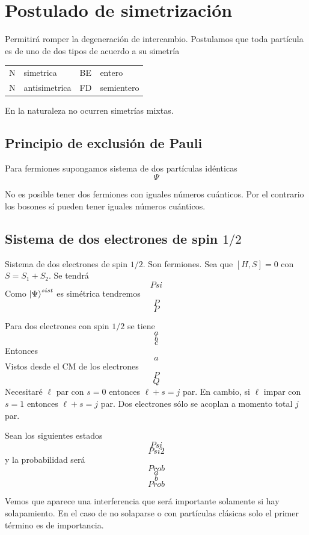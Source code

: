 \documentclass[10pt,oneside]{CBFT_book}
\begin{document}
\section{Postulado de simetrización}

Permitirá romper la degeneración de intercambio. 
Postulamos que toda partícula es de uno de dos tipos de acuerdo a su simetría 

\begin{center}
\begin{tabular}{llll}
N & simetrica & BE & entero\\
N & antisimetrica & FD & semientero
\end{tabular}
\end{center}

En la naturaleza no ocurren simetrías mixtas.

\subsection{Principio de exclusión de Pauli}

Para fermiones supongamos sistema de dos partículas idénticas 
\[
	\Psi
\]

No es posible tener dos fermiones con iguales números cuánticos. Por el contrario los bosones sí pueden tener 
iguales números cuánticos.

\subsection{Sistema de dos electrones de spin $1/2$}

Sistema de dos electrones de spin $1/2$. Son fermiones. Sea que $[H,S]=0$  con $S = S_1 + S_2$. Se tendrá 
\[
	Psi
\]
Como $\Ket{\Psi}^{sist}$ es simétrica tendremos 
\[
	P
\]
\[
	P
\]

Para dos electrones con spin $1/2$ se tiene 
\[
	a
\]
\[
	b
\]
\[
	c
\]
Entonces 
\[
	a
\]
Vistos desde el CM de los electrones
\[
	P
\]
\[
	Q
\]
Necesitaré $\ell$ par con $s=0$ entonces $\ell+s=j$ par. En cambio, si $\ell$ impar con $s=1$ entonces 
$\ell+s=j$ par. Dos electrones sólo se acoplan a momento total $j$ par.

Sean los siguientes estados 
\[
	Psi
\]
\[
	Psi2
\]
y la probabilidad será
\[
	Prob
\]
\[
	a
\]
\[
	b
\]
\[
	Prob
\]

Vemos que aparece una interferencia que será importante solamente si hay solapamiento. En el caso de no 
solaparse o con partículas clásicas solo el primer término es de importancia.
\end{document}
